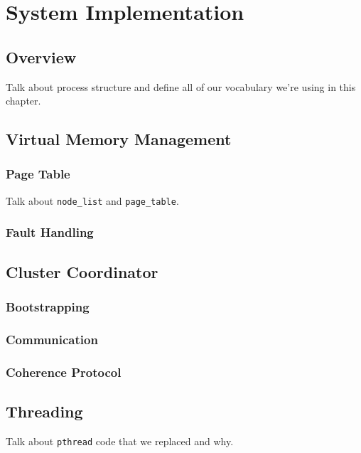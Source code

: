 \section{System Implementation}

\subsection{Overview}
Talk about process structure and define all of our vocabulary we're using in this chapter.

\subsection{Virtual Memory Management}
\subsubsection{Page Table}
Talk about \verb,node_list, and \verb,page_table,.
\subsubsection{Fault Handling}

\subsection{Cluster Coordinator}
\subsubsection{Bootstrapping}
\subsubsection{Communication}
\subsubsection{Coherence Protocol}

\subsection{Threading}
Talk about \verb,pthread, code that we replaced and why.